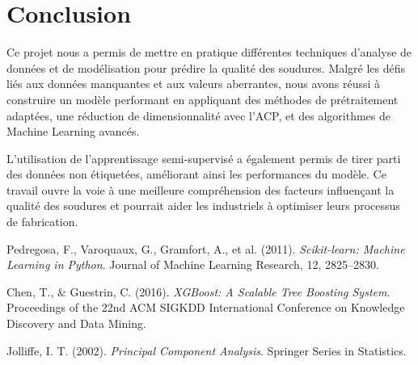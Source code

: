 \documentclass{article}
\begin{document}
\section{Conclusion}

Ce projet nous a permis de mettre en pratique différentes techniques d'analyse de données et de modélisation pour prédire la qualité des soudures. Malgré les défis liés aux données manquantes et aux valeurs aberrantes, nous avons réussi à construire un modèle performant en appliquant des méthodes de prétraitement adaptées, une réduction de dimensionnalité avec l'ACP, et des algorithmes de Machine Learning avancés.

L'utilisation de l'apprentissage semi-supervisé a également permis de tirer parti des données non étiquetées, améliorant ainsi les performances du modèle. Ce travail ouvre la voie à une meilleure compréhension des facteurs influençant la qualité des soudures et pourrait aider les industriels à optimiser leurs processus de fabrication.

\begin{thebibliography}{9}

Pedregosa, F., Varoquaux, G., Gramfort, A., et al. (2011). \textit{Scikit-learn: Machine Learning in Python}. Journal of Machine Learning Research, 12, 2825–2830.

Chen, T., \& Guestrin, C. (2016). \textit{XGBoost: A Scalable Tree Boosting System}. Proceedings of the 22nd ACM SIGKDD International Conference on Knowledge Discovery and Data Mining.

Jolliffe, I. T. (2002). \textit{Principal Component Analysis}. Springer Series in Statistics.

\end{thebibliography}
\end{document}
